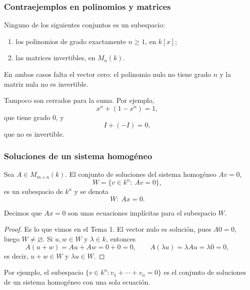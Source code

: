 \begin{frame}
    \frametitle{Contraejemplos en polinomios y matrices}

    \begin{example}
        Ninguno de los siguientes conjuntos es un subespacio:
        \begin{enumerate}
            \item los polinomios de grado \alert{exactamente} $n\geq1$, en $k[x]$;
            \item las matrices invertibles, en $M_n(k)$.
        \end{enumerate}
    \end{example}

    \medskip

    En ambos casos falta el vector cero: el polinomio nulo no tiene grado $n$
    y la matriz nula no es invertible.

    \medskip

    Tampoco son cerrados para la suma. Por ejemplo,
    \[
        x^n+(1-x^n)=1,
    \]
    que tiene grado $0$, y
    \[
        I+(-I)=0,
    \]
    que no es invertible.
\end{frame}

\begin{frame}[allowframebreaks, t]
    \frametitle{Soluciones de un sistema homogéneo}

    \begin{proposition}
        Sea $A\in M_{m\times n}(k)$. El conjunto de soluciones del sistema
        homogéneo $Av=0$,
        \[
            W=\{v\in k^n:\ Av=0\},
        \]
        es un subespacio de $k^n$ y se denota
        \[W\colon\ Ax=0.\]
    \end{proposition}

    Decimos que $Ax=0$ son unas \alert{ecuaciones implícitas} para el subespacio $W$.

    \framebreak

    \begin{proof}
        Es lo que vimos en el Tema 1. El vector nulo es solución, pues $A0=0$,
        luego $W\neq\varnothing$. Si $u,w\in W$ y $\lambda\in k$, entonces
        \[
            A(u+w)=Au+Aw=0+0=0,
            \qquad
            A(\lambda u)=\lambda Au=\lambda0=0,
        \]
        es decir, $u+w\in W$ y $\lambda u\in W$.
    \end{proof}


    Por ejemplo, el subespacio $\{v\in k^n: v_1+\cdots+v_n=0\}$ es el
    conjunto de soluciones de un sistema homogéneo con una sola ecuación.
\end{frame}

